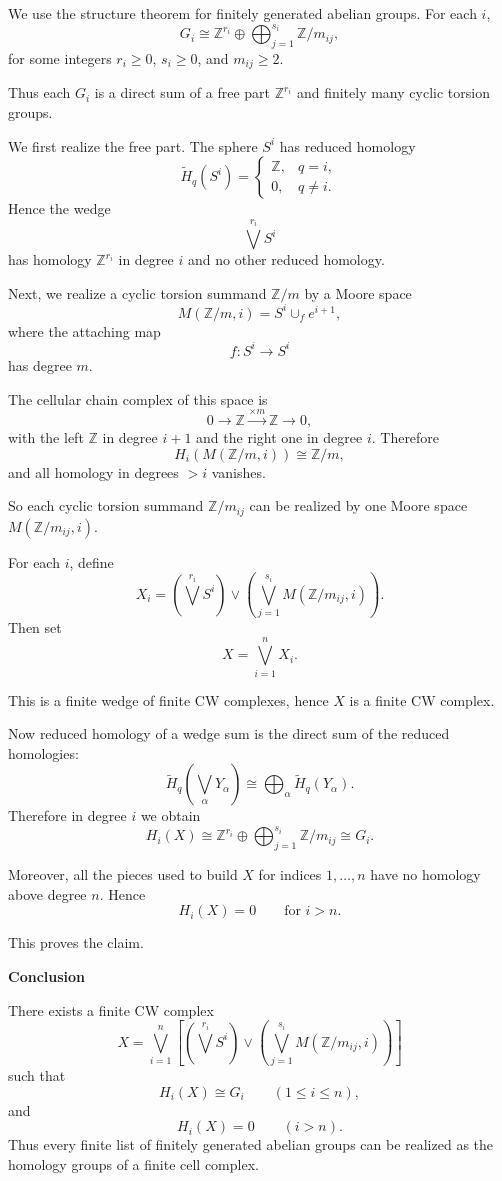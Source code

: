 \begin{solution}
We use the structure theorem for finitely generated abelian groups. For each \(i\),
\[
G_i \cong \mathbb Z^{r_i}\oplus \bigoplus_{j=1}^{s_i}\mathbb Z/m_{ij},
\]
for some integers \(r_i\ge 0\), \(s_i\ge 0\), and \(m_{ij}\ge 2\).

Thus each \(G_i\) is a direct sum of a free part \(\mathbb Z^{r_i}\) and finitely many cyclic torsion groups.

\par
\noindent
We first realize the free part. The sphere \(S^i\) has reduced homology
\[
\widetilde H_q(S^i)=
\begin{cases}
	\mathbb Z, & q=i,\\
	0, & q\ne i.
\end{cases}
\]
Hence the wedge
\[
\bigvee^{r_i} S^i
\]
has homology \(\mathbb Z^{r_i}\) in degree \(i\) and no other reduced homology.

\par
\noindent
Next, we realize a cyclic torsion summand \(\mathbb Z/m\) by a Moore space
\[
M(\mathbb Z/m,i)=S^i\cup_f e^{i+1},
\]
where the attaching map
\[
f:S^i\to S^i
\]
has degree \(m\).

The cellular chain complex of this space is
\[
0\to \mathbb Z \xrightarrow{\times m} \mathbb Z \to 0,
\]
with the left \(\mathbb Z\) in degree \(i+1\) and the right one in degree \(i\). Therefore
\[
H_i(M(\mathbb Z/m,i))\cong \mathbb Z/m,
\]
and all homology in degrees \(>i\) vanishes.

So each cyclic torsion summand \(\mathbb Z/m_{ij}\) can be realized by one Moore space \(M(\mathbb Z/m_{ij},i)\).

\par
\noindent
For each \(i\), define
\[
X_i
=
\left(\bigvee^{r_i} S^i\right)
\vee
\left(\bigvee_{j=1}^{s_i} M(\mathbb Z/m_{ij},i)\right).
\]
Then set
\[
X=\bigvee_{i=1}^n X_i.
\]

This is a finite wedge of finite CW complexes, hence \(X\) is a finite CW complex.

Now reduced homology of a wedge sum is the direct sum of the reduced homologies:
\[
\widetilde H_q\!\left(\bigvee_\alpha Y_\alpha\right)
\cong
\bigoplus_\alpha \widetilde H_q(Y_\alpha).
\]
Therefore in degree \(i\) we obtain
\[
H_i(X)
\cong
\mathbb Z^{r_i}\oplus \bigoplus_{j=1}^{s_i}\mathbb Z/m_{ij}
\cong
G_i.
\]

Moreover, all the pieces used to build \(X\) for indices \(1,\dots,n\) have no homology above degree \(n\). Hence
\[
H_i(X)=0 \qquad \text{for } i>n.
\]

This proves the claim.


\medskip
\noindent\textbf{Conclusion}\par
\smallskip

There exists a finite CW complex
\[
X=\bigvee_{i=1}^n
\left[
\left(\bigvee^{r_i} S^i\right)
\vee
\left(\bigvee_{j=1}^{s_i} M(\mathbb Z/m_{ij},i)\right)
\right]
\]
such that
\[
H_i(X)\cong G_i \qquad (1\le i\le n),
\]
and
\[
H_i(X)=0 \qquad (i>n).
\]
Thus every finite list of finitely generated abelian groups can be realized as the homology groups of a finite cell complex.
\end{solution}

